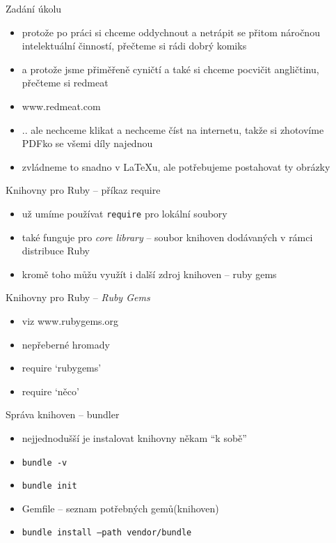 \documentclass{beamer}
\begin{document}
\begin{frame}{Zadání úkolu}
  \begin{itemize}
    \item protože po práci si chceme oddychnout a netrápit se přitom náročnou intelektuální činností, přečteme si rádi dobrý komiks
    \item a protože jsme přiměřeně cyničtí a také si chceme pocvičit angličtinu, přečteme si redmeat
    \item www.redmeat.com
    \item .. ale nechceme klikat a nechceme číst na internetu, takže si zhotovíme PDFko se všemi díly najednou
    \item zvládneme to snadno v LaTeXu, ale potřebujeme postahovat ty obrázky
  \end{itemize}
\end{frame}

\begin{frame}{Knihovny pro Ruby -- příkaz require}
  \begin{itemize}
    \item už umíme používat \texttt{require} pro lokální soubory
    \item také funguje pro \emph{core library} -- soubor knihoven dodávaných v rámci distribuce Ruby
    \item kromě toho můžu využít i další zdroj knihoven -- ruby gems
  \end{itemize}
\end{frame}

\begin{frame}{Knihovny pro Ruby -- \emph{Ruby Gems}}
  \begin{itemize}
    \item viz www.rubygems.org
    \item nepřeberné hromady
    \item require `rubygems'
    \item require `něco'
  \end{itemize}
\end{frame}

\begin{frame}{Správa knihoven -- bundler}
  \begin{itemize}
    \item  nejjednodušší je instalovat knihovny někam ``k sobě''
    \item  \texttt{bundle -v}
    \item  \texttt{bundle init}
    \item  Gemfile -- seznam potřebných gemů(knihoven)
    \item  \texttt{bundle install --path vendor/bundle}
  \end{itemize}
\end{frame}
\end{document}
